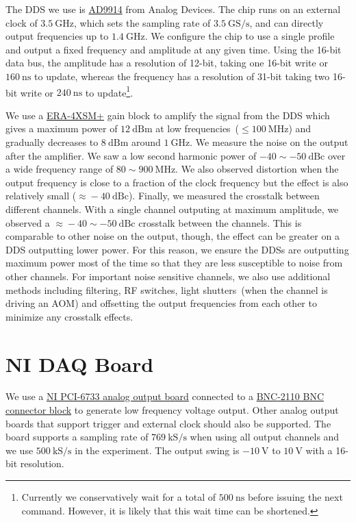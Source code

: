 The DDS we use is \href{https://www.analog.com/en/products/ad9914.html}{AD9914}
from Analog Devices.
The chip runs on an external clock of $3.5~\mathrm{GHz}$,
which sets the sampling rate of $3.5~\mathrm{GS/s}$,
and can directly output frequencies up to $1.4~\mathrm{GHz}$.
We configure the chip to use a single profile and output a fixed frequency and amplitude
at any given time.
Using the 16-bit data bus,
the amplitude has a resolution of 12-bit, taking one 16-bit write or $160~\mathrm{ns}$ to update,
whereas the frequency has a resolution of 31-bit
taking two 16-bit write or $240~\mathrm{ns}$ to update\footnote{
  Currently we conservatively wait for a total of $500~\mathrm{ns}$
  before issuing the next command.
  However, it is likely that this wait time can be shortened.
}.

We use a \href{https://www.minicircuits.com/WebStore/dashboard.html?model=ERA-4XSM\%2B}{ERA-4XSM+}
gain block to amplify the signal from the DDS which gives a maximum power of $12~\mathrm{dBm}$
at low frequencies~($\leqslant\!100~\mathrm{MHz}$) and gradually decreases to $8~\mathrm{dBm}$
around $1~\mathrm{GHz}$.
We measure the noise on the output after the amplifier.
We saw a low second harmonic power of $-40\sim-50~\mathrm{dBc}$
over a wide frequency range of $80\sim900~\mathrm{MHz}$.
We also observed distortion when the output frequency is close to
a fraction of the clock frequency but the effect is also relatively small
($\approx\!-40~\mathrm{dBc}$).
Finally, we measured the crosstalk between different channels.
With a single channel outputing at maximum amplitude,
we observed a $\approx\!-40\sim-50~\mathrm{dBc}$ crosstalk between the channels.
This is comparable to other noise on the output, though,
the effect can be greater on a DDS outputting lower power.
For this reason, we ensure the DDSs are outputting maximum power most of the time
so that they are less susceptible to noise from other channels.
For important noise sensitive channels,
we also use additional methods including filtering, RF switches,
light shutters~(when the channel is driving an AOM)
and offsetting the output frequencies from each other to minimize any crosstalk effects.

\section{NI DAQ Board}
\label{appendex:computer-control:nidaq}

We use a \href{https://www.ni.com/en-us/support/model.pci-6733.html}
{NI PCI-6733 analog output board} connected to a
\href{https://www.ni.com/en-us/support/model.bnc-2110.html}{BNC-2110 BNC connector block}
to generate low frequency voltage output.
Other analog output boards that support trigger and external clock should also be supported.
The board supports a sampling rate of $769~\mathrm{kS/s}$ when using all output channels
and we use $500~\mathrm{kS/s}$ in the experiment.
The output swing is $-10~\mathrm{V}$ to $10~\mathrm{V}$ with a 16-bit resolution.

